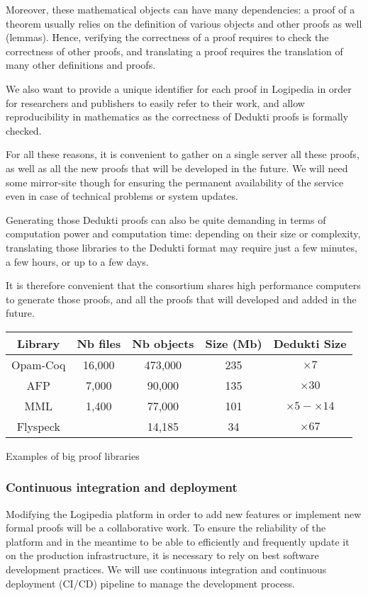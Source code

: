 Moreover, these mathematical objects can have many dependencies: a
proof of a theorem usually relies on the definition of various objects
and other proofs as well (lemmas). Hence, verifying the correctness of
a proof requires to check the correctness of other proofs, and
translating a proof requires the translation of many other definitions
and proofs.

We also want to provide a unique identifier for each proof in
Logipedia in order for researchers and publishers to easily refer to
their work, and allow reproducibility in mathematics as the
correctness of Dedukti proofs is formally checked.

For all these reasons, it is convenient to gather on a single server
all these proofs, as well as all the new proofs that will be developed
in the future. We will need some mirror-site though for ensuring the
permanent availability of the service even in case of technical
problems or system updates.

Generating those Dedukti proofs can also be quite demanding in terms
of computation power and computation time: depending on their size or
complexity, translating those libraries to the Dedukti format may
require just a few minutes, a few hours, or up to a few days.

It is therefore convenient that the consortium shares high performance
computers to generate those proofs, and all the proofs that will
developed and added in the future.

\begin{center}
\begin{tabular}{|c|c|c|c|c|}\hline
Library & Nb files & Nb objects & Size (Mb) & Dedukti Size\\\hline
Opam-Coq & 16,000 & 473,000 & 235 & $\times 7$\\\hline
AFP & 7,000 & 90,000 & 135 & $\times 30$\\\hline
MML & 1,400 & 77,000 & 101 & $\times 5-\times 14$\\\hline
Flyspeck & & 14,185 & 34 & $\times 67$\\\hline
\end{tabular}

\medskip

Examples of big proof libraries
\end{center}

\subsubsection*{Continuous integration and deployment}
Modifying the Logipedia platform in order to add new features or implement
new formal proofs will be a collaborative work. To ensure the reliability
of the platform and in the meantime to be able to efficiently and
frequently update it on the production infrastructure,
it is necessary to rely on best software development practices.
We will use continuous integration and continuous deployment (CI/CD)
pipeline to manage the development process.

